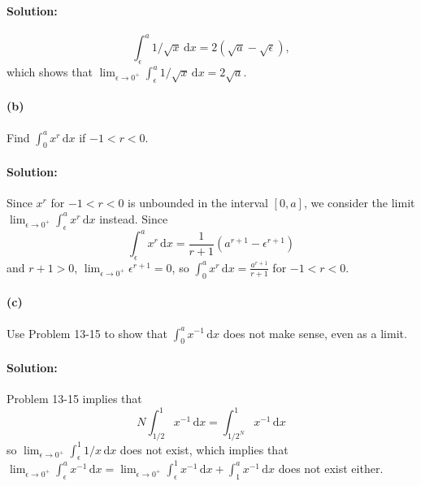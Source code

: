 \documentclass{article}
\begin{document}
\paragraph{Solution:} \begin{equation*}
  \int_{\epsilon}^a 1/\sqrt{x} \,\mathrm{d}x = 2(\sqrt{a} - \sqrt{\epsilon}),
\end{equation*} which shows that $\lim_{\epsilon \rightarrow 0^+}
\int_{\epsilon}^a 1/\sqrt{x} \,\mathrm{d}x = 2\sqrt{a}$.

\paragraph{(b)} Find $\int_0^a x^r \,\mathrm{d}x$ if $-1 < r < 0$.

\paragraph{Solution:} Since $x^r$ for $-1 < r < 0$ is unbounded in the interval
$[0, a]$, we consider the limit $\lim_{\epsilon \rightarrow 0^+}
\int_{\epsilon}^a x^r \,\mathrm{d}x$ instead. Since \begin{equation*}
  \int_{\epsilon}^a x^r \,\mathrm{d}x = \frac{1}{r + 1}(a^{r + 1} -
  \epsilon^{r + 1})
\end{equation*} and $r + 1 > 0$, $\lim_{\epsilon \rightarrow 0^+}
\epsilon^{r + 1} = 0$, so $\int_0^a x^r \,\mathrm{d}x =
\frac{a^{r + 1}}{r + 1}$ for $-1 < r < 0$.

\paragraph{(c)} Use Problem 13-15 to show that $\int_0^a x^{-1} \,\mathrm{d}x$
does not make sense, even as a limit.

\paragraph{Solution:} Problem 13-15 implies that \begin{equation*}
  N\int_{1/2}^1 x^{-1} \,\mathrm{d}x = \int_{1/2^N}^1 x^{-1} \,\mathrm{d}x
\end{equation*} so $\lim_{\epsilon \rightarrow 0^+} \int_{\epsilon}^1 1/x
\,\mathrm{d}x$ does not exist, which implies that
$\lim_{\epsilon \rightarrow 0^+} \int_{\epsilon}^a x^{-1} \,\mathrm{d}x =
\lim_{\epsilon \rightarrow 0^+} \int_{\epsilon}^1 x^{-1} \,\mathrm{d}x +
\int_1^a x^{-1} \,\mathrm{d}x$ does not exist either.
\end{document}
